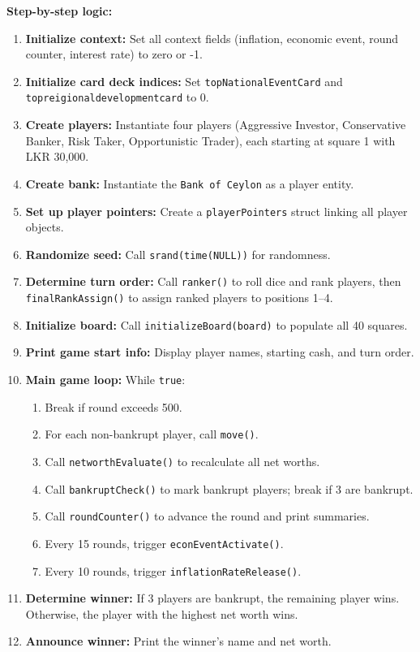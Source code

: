 \documentclass[12pt,a4paper]{article}
\begin{document}
\textbf{Step-by-step logic:}
\begin{enumerate}[noitemsep]
    \item \textbf{Initialize context:} Set all context fields (inflation, economic event, round counter, interest rate) to zero or -1.
    \item \textbf{Initialize card deck indices:} Set \texttt{topNationalEventCard} and \texttt{topreigionaldevelopmentcard} to 0.
    \item \textbf{Create players:} Instantiate four players (Aggressive Investor, Conservative Banker, Risk Taker, Opportunistic Trader), each starting at square 1 with LKR 30,000.
    \item \textbf{Create bank:} Instantiate the \texttt{Bank of Ceylon} as a player entity.
    \item \textbf{Set up player pointers:} Create a \texttt{playerPointers} struct linking all player objects.
    \item \textbf{Randomize seed:} Call \texttt{srand(time(NULL))} for randomness.
    \item \textbf{Determine turn order:} Call \texttt{ranker()} to roll dice and rank players, then \texttt{finalRankAssign()} to assign ranked players to positions 1--4.
    \item \textbf{Initialize board:} Call \texttt{initializeBoard(board)} to populate all 40 squares.
    \item \textbf{Print game start info:} Display player names, starting cash, and turn order.
    \item \textbf{Main game loop:} While \texttt{true}:
    \begin{enumerate}[noitemsep]
        \item Break if round exceeds 500.
        \item For each non-bankrupt player, call \texttt{move()}.
        \item Call \texttt{networthEvaluate()} to recalculate all net worths.
        \item Call \texttt{bankruptCheck()} to mark bankrupt players; break if 3 are bankrupt.
        \item Call \texttt{roundCounter()} to advance the round and print summaries.
        \item Every 15 rounds, trigger \texttt{econEventActivate()}.
        \item Every 10 rounds, trigger \texttt{inflationRateRelease()}.
    \end{enumerate}
    \item \textbf{Determine winner:} If 3 players are bankrupt, the remaining player wins. Otherwise, the player with the highest net worth wins.
    \item \textbf{Announce winner:} Print the winner's name and net worth.
\end{enumerate}
\end{document}
